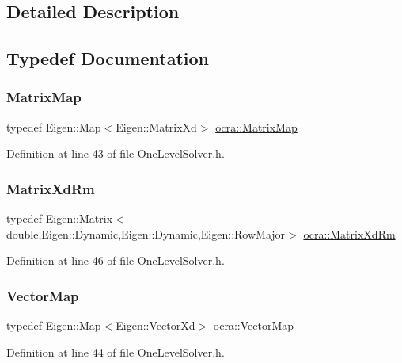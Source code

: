 \subsection{Detailed Description}


\subsection{Typedef Documentation}
\hypertarget{group__solver_ga2890a4739c18700eeea0645d1e41b5f7}{}\label{group__solver_ga2890a4739c18700eeea0645d1e41b5f7} 
\subsubsection{\texorpdfstring{Matrix\+Map}{MatrixMap}}
{\footnotesize\ttfamily typedef Eigen\+::\+Map$<$Eigen\+::\+Matrix\+Xd$>$ \hyperlink{group__solver_ga2890a4739c18700eeea0645d1e41b5f7}{ocra\+::\+Matrix\+Map}}



Definition at line 43 of file One\+Level\+Solver.\+h.

\hypertarget{group__solver_ga70eb87299c2fc1db3c4aac05df67d889}{}\label{group__solver_ga70eb87299c2fc1db3c4aac05df67d889} 
\subsubsection{\texorpdfstring{Matrix\+Xd\+Rm}{MatrixXdRm}}
{\footnotesize\ttfamily typedef Eigen\+::\+Matrix$<$double,Eigen\+::\+Dynamic,Eigen\+::\+Dynamic,Eigen\+::\+Row\+Major$>$ \hyperlink{group__solver_ga70eb87299c2fc1db3c4aac05df67d889}{ocra\+::\+Matrix\+Xd\+Rm}}



Definition at line 46 of file One\+Level\+Solver.\+h.

\hypertarget{group__solver_ga48f83fdb8879c800a49682c6f9c3f2e5}{}\label{group__solver_ga48f83fdb8879c800a49682c6f9c3f2e5} 
\subsubsection{\texorpdfstring{Vector\+Map}{VectorMap}}
{\footnotesize\ttfamily typedef Eigen\+::\+Map$<$Eigen\+::\+Vector\+Xd$>$ \hyperlink{group__solver_ga48f83fdb8879c800a49682c6f9c3f2e5}{ocra\+::\+Vector\+Map}}



Definition at line 44 of file One\+Level\+Solver.\+h.

